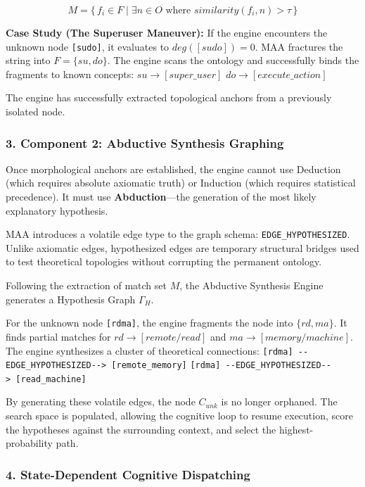 \documentclass[
  11pt,
  a4paper,
]{article}
\begin{document}
\[ M = \{\, f_i \in F \mid \exists n \in O \text{ where } similarity(f_i, n) > \tau \,\} \]

\textbf{Case Study (The Superuser Maneuver):} If the engine encounters
the unknown node \texttt{{[}sudo{]}}, it evaluates to
\(deg([sudo]) = 0\). MAA fractures the string into \(F = \{su, do\}\).
The engine scans the ontology and successfully binds the fragments to
known concepts: \(su \rightarrow [super\_user]\)
\(do \rightarrow [execute\_action]\)

The engine has successfully extracted topological anchors from a
previously isolated node.

\subsubsection{3. Component 2: Abductive Synthesis
Graphing}\label{component-2-abductive-synthesis-graphing}

Once morphological anchors are established, the engine cannot use
Deduction (which requires absolute axiomatic truth) or Induction (which
requires statistical precedence). It must use \textbf{Abduction}---the
generation of the most likely explanatory hypothesis.

MAA introduces a volatile edge type to the graph schema:
\texttt{EDGE\_HYPOTHESIZED}. Unlike axiomatic edges, hypothesized edges
are temporary structural bridges used to test theoretical topologies
without corrupting the permanent ontology.

Following the extraction of match set \(M\), the Abductive Synthesis
Engine generates a Hypothesis Graph \(\Gamma_H\).

For the unknown node \texttt{{[}rdma{]}}, the engine fragments the node
into \(\{rd, ma\}\). It finds partial matches for
\(rd \rightarrow [remote / read]\) and
\(ma \rightarrow [memory / machine]\). The engine synthesizes a cluster
of theoretical connections:
\texttt{{[}rdma{]}\ -\/-EDGE\_HYPOTHESIZED-\/-\textgreater{}\ {[}remote\_memory{]}}
\texttt{{[}rdma{]}\ -\/-EDGE\_HYPOTHESIZED-\/-\textgreater{}\ {[}read\_machine{]}}

By generating these volatile edges, the node \(C_{unk}\) is no longer
orphaned. The search space is populated, allowing the cognitive loop to
resume execution, score the hypotheses against the surrounding context,
and select the highest-probability path.

\subsubsection{4. State-Dependent Cognitive
Dispatching}\label{state-dependent-cognitive-dispatching}
\end{document}
